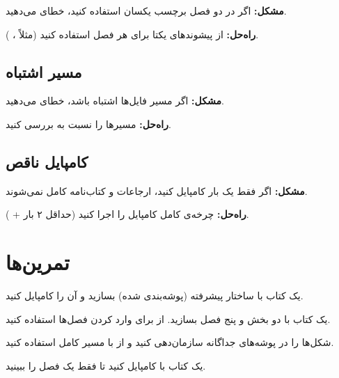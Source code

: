 \textbf{مشکل:} اگر در دو فصل برچسب یکسان
استفاده کنید، خطای 
می‌دهید.

\textbf{راه‌حل:} از پیشوندهای یکتا برای
هر فصل استفاده کنید (مثلاً ،
).

\subsection{مسیر اشتباه}
\label{sec:large-projects-mistake-path}

\textbf{مشکل:} اگر مسیر فایل‌ها اشتباه
باشد، خطای  می‌دهید.

\textbf{راه‌حل:} مسیرها را نسبت به
 بررسی کنید.

\subsection{کامپایل ناقص}
\label{sec:large-projects-mistake-incomplete}

\textbf{مشکل:} اگر فقط یک بار کامپایل
کنید، ارجاعات و کتاب‌نامه کامل نمی‌شوند.

\textbf{راه‌حل:} چرخه‌ی کامل کامپایل را
اجرا کنید (حداقل ۲ بار  +
).

\section{تمرین‌ها}
\label{sec:large-projects-exercises}

\begin{exercise}
    یک کتاب با ساختار پیشرفته (پوشه‌بندی
    شده) بسازید و آن را کامپایل کنید.
    \label{exc:large-projects-structure}
\end{exercise}

\begin{exercise}
    یک کتاب با دو بخش و پنج فصل بسازید.
    از  برای وارد کردن فصل‌ها
    استفاده کنید.
    \label{exc:large-projects-parts}
\end{exercise}

\begin{exercise}
    شکل‌ها را در پوشه‌های جداگانه سازمان‌دهی
    کنید و از  با
    مسیر کامل استفاده کنید.
    \label{exc:large-projects-figures}
\end{exercise}

\begin{exercise}
    یک کتاب با  کامپایل
    کنید تا فقط یک فصل را ببینید.
    \label{exc:large-projects-includeonly}
\end{exercise}

